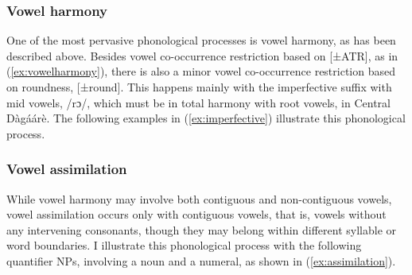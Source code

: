 \subsubsection{Vowel harmony}
One of the most pervasive phonological processes is vowel harmony, as has been
described above. Besides vowel co-occurrence restriction based on [±ATR], as in (\ref{ex:vowelharmony}), there is
also a minor vowel co-occurrence restriction based on roundness, [±round]. This happens
mainly with the imperfective suffix with mid vowels, /rɔ/, which must be in total harmony
with root vowels, in Central Dàgáárè. The following examples in (\ref{ex:imperfective}) illustrate this
phonological process.




\subsubsection{Vowel assimilation}
While vowel harmony may involve both contiguous and non-contiguous vowels,
vowel assimilation occurs only with contiguous vowels, that is, vowels without any intervening consonants, though they may belong within different syllable or word boundaries. I illustrate this phonological process with the following quantifier NPs, involving a noun and a numeral, as shown in (\ref{ex:assimilation}).

\ea \label{ex:assimilation} 
\z\z 







